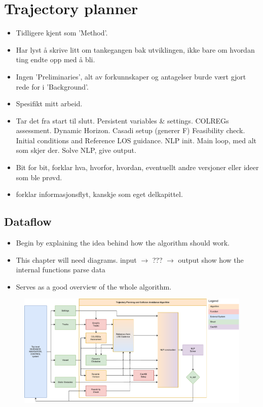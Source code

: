 \section{Trajectory planner}
\begin{itemize}
    \item Tidligere kjent som 'Method'.
    \item Har lyst å skrive litt om tankegangen bak utviklingen, ikke bare om hvordan ting endte opp med å bli.
    \item Ingen 'Preliminaries', alt av forkunnskaper og antagelser burde vært gjort rede for i 'Background'.
    \item Spesifikt mitt arbeid.
    \item Tar det fra start til slutt. 
    \subitem Persistent variables \& settings.
    \subitem COLREGs assessment.
    \subitem Dynamic Horizon.
    \subitem Casadi setup (generer F)
    \subitem Feasibility check.
    \subitem Initial conditions and Reference LOS guidance.
    \subitem NLP init.
    \subitem Main loop, med alt som skjer der.
    \subitem Solve NLP, give output.
    \item Bit for bit, forklar hva, hvorfor, hvordan, eventuellt andre versjoner eller ideer som ble prøvd.
    \item forklar informasjonsflyt, kanskje som eget delkapittel. 
\end{itemize}

\subsection{Dataflow}
\begin{itemize}
    \item Begin by explaining the idea behind how the algorithm should work.
    \item This chapter will need diagrams.
    \subitem input $\rightarrow$ ??? $\rightarrow$ output
    \subitem show how the internal functions parse data
    \item Serves as a good overview of the whole algorithm.
\end{itemize}

\begin{figure}
    \label{FIG: Dataflow chart}
    \includegraphics[width=\textwidth]{Images/SimpleSystem.pdf}
\end{figure}


